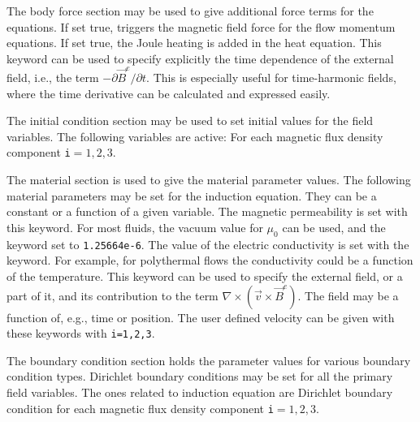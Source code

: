 The body force section may be used to give additional force terms for the equations.
\sifbegin
{} If set true, triggers the magnetic
field force for the flow momentum equations.
 If set true, the Joule heating is added in the
heat equation.
 This keyword can be used to specify
explicitly the time dependence of the external field, i.e., the term
$-\partial\vec{B}^e/\partial t$. This is especially useful for time-harmonic
fields, where the time derivative can be calculated and expressed easily.
\sifend

The initial condition section may be used to set initial values for the field
variables. The following variables are active:
\sifbegin
{} 
For each magnetic flux density component {\tt i}$=1,2,3$.
\sifend

The material section is used to give the material parameter values. The
following material parameters may be set for the induction equation. They can
be a constant or a function of a given variable.
\sifbegin
{} The magnetic permeability is set with
this keyword. For most fluids, the vacuum value for $\mu_0$ can be used,
and the keyword set to {\tt 1.25664e-6}.
 The value of the electric
conductivity is set with the keyword. For example, for polythermal flows the
conductivity could be a function of the temperature.
 This keyword can be used to specify
the external field, or a part of it, and its contribution to the term
$\nabla\times(\vec{v}\times \vec{B}^e)$. The field may be a function of, e.g.,
time or position.
The user defined velocity can be given with these keywords with \texttt{i=1,2,3}.
\sifend

The boundary condition section holds the parameter values for various
boundary condition types. Dirichlet boundary conditions may be
set for all the primary field variables. The ones related to induction equation
are
\sifbegin
{} 
Dirichlet boundary condition
for each magnetic flux density component {\tt i}$=1,2,3$.
\sifend

\sifend


%
%
